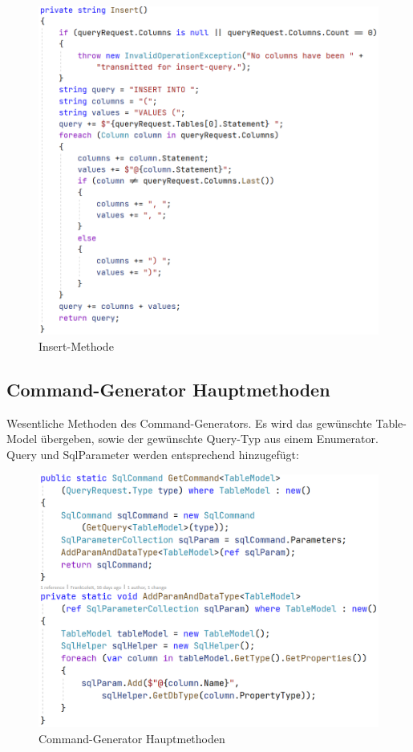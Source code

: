 \documentclass[11pt,toc=sectionentrywithoutdots, 
headheight=44pt, headings=optiontoheadandtoc, hyperfootnotes=false, hypertexnames=false]{scrartcl}
\begin{document}
 \begin{figure}[H]
 \centering

	\includegraphics[scale=0.7]{insert.PNG}
	 \caption{Insert-Methode}
 \end{figure}
 \clearpage

    \subsection{Command-Generator Hauptmethoden}
Wesentliche Methoden des Command-Generators. Es wird das gewünschte Table-Model übergeben, sowie der gewünschte Query-Typ aus einem Enumerator. Query und SqlParameter werden entsprechend hinzugefügt:
 \label{fig:Command-Generator Hauptmethoden}

 \begin{figure}[H]

	\includegraphics[scale=0.6]{commandGenerator.PNG}
	 \caption{Command-Generator Hauptmethoden}
 \end{figure}
\end{document}
